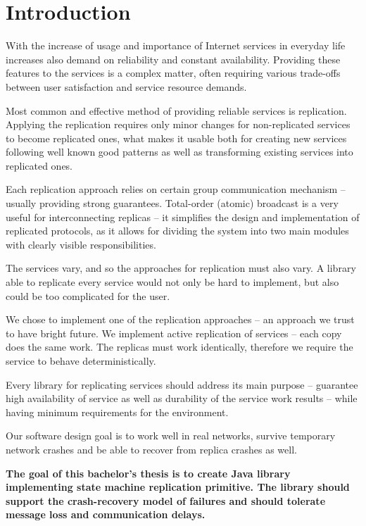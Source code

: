 
\chapter{Introduction}

With the increase of usage and importance of Internet services in everyday life increases also demand on reliability and constant availability.
Providing these features to the services is a complex matter, often requiring various trade-offs between user satisfaction and service resource demands.

Most common and effective method of providing reliable services is replication. Applying the replication requires only minor changes for non-replicated services to become replicated ones, what makes it usable both for creating new services following well known good patterns as well as transforming existing services into replicated ones.

Each replication approach relies on certain group communication mechanism -- usually providing strong guarantees. Total-order (atomic) broadcast is a very useful for interconnecting replicas -- it simplifies the design and implementation of replicated protocols, as it allows for dividing the system into two main modules with clearly visible responsibilities.

The services vary, and so the approaches for replication must also vary. A library able to replicate every service would not only be hard to implement, but also could be too complicated for the user.

We chose to implement one of the replication approaches -- an approach we trust to have bright future.
We implement active replication of services -- each copy does the same work. The replicas must work identically, therefore we require the service to behave deterministically.

Every library for replicating services should address its main purpose -- guarantee high availability of service as well as durability of the service work results -- while having minimum requirements for the environment.

Our software design goal is to work well in real networks, survive temporary network crashes and be able to recover from replica crashes as well.

{
\bfseries
The goal of this bachelor's thesis is to create Java library implementing state machine replication primitive. The library should support the crash-recovery model of failures and should tolerate message loss and communication delays.
}

